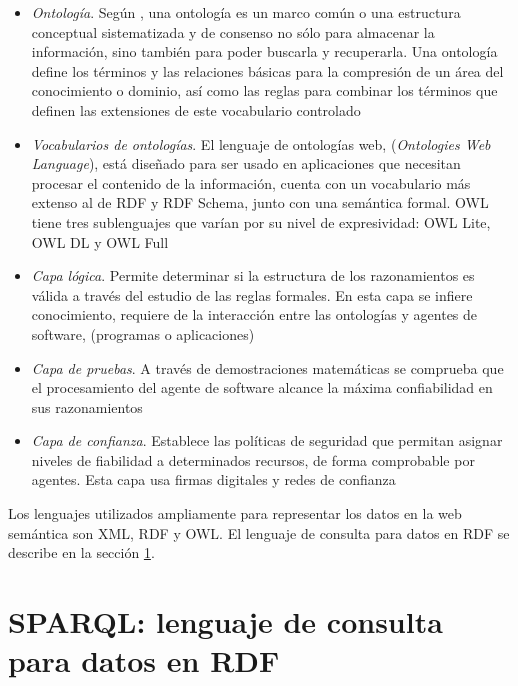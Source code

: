 \begin{itemize}
    
    \item \textit{Ontolog\'ia}. Seg\'un \cite{Ontologias}, una ontolog\'ia es un marco com\'un o una estructura conceptual sistematizada y de consenso no s\'olo para almacenar la informaci\'on, sino tambi\'en para poder buscarla y recuperarla. Una ontolog\'ia define los t\'erminos y las relaciones b\'asicas para la compresi\'on de un \'area del conocimiento o dominio, as\'i como las reglas para combinar los t\'erminos que definen las extensiones de este vocabulario controlado
    
    \item \textit{Vocabularios de ontolog\'ias}. El lenguaje de ontolog\'ias web, (\textit{Ontologies Web Language}), est\'a dise\~{n}ado para ser usado en aplicaciones que necesitan procesar el contenido de la informaci\'on,  cuenta con un vocabulario m\'as extenso al de RDF y RDF Schema, junto con una sem\'antica formal. OWL tiene tres sublenguajes que var\'ian por su nivel de expresividad: OWL Lite, OWL DL y OWL Full \cite{LaWebSemantica}
    
    \item \textit{Capa l\'ogica}. Permite determinar si la estructura de los razonamientos es v\'alida a trav\'es del estudio de las reglas formales. En esta capa se infiere conocimiento, requiere de la interacci\'on entre las ontolog\'ias y agentes de software, (programas o aplicaciones) \cite{LaWebSemantica}
    
    \item \textit{Capa de pruebas}. A trav\'es de demostraciones matem\'aticas se comprueba que el procesamiento del agente de software alcance la m\'axima confiabilidad en sus razonamientos \cite{LaWebSemantica}
    
    \item \textit{Capa de confianza}. Establece las pol\'iticas de seguridad que permitan asignar niveles de fiabilidad a determinados recursos, de forma comprobable por agentes. Esta capa usa firmas digitales y redes de confianza \cite{LaWebSemantica}

\end{itemize}

Los lenguajes utilizados ampliamente para representar los datos en la web sem\'antica son XML, RDF y OWL. El lenguaje de consulta para datos en RDF se describe en la secci\'on \ref{SPARQL}.

\section{SPARQL: lenguaje de consulta para datos en RDF}
\label{SPARQL}

